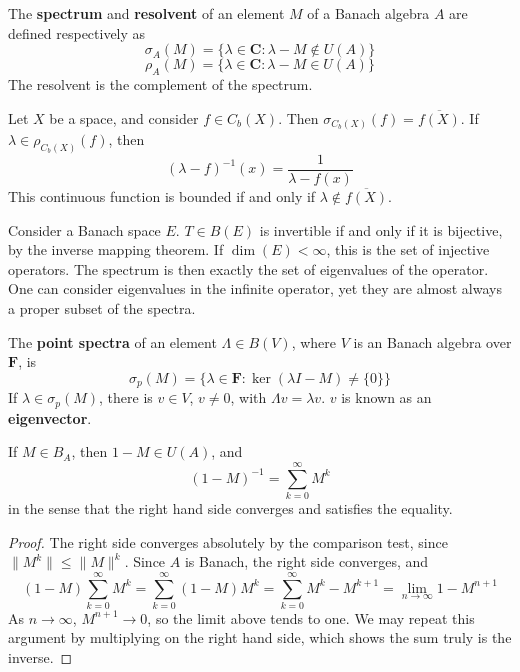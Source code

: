 \begin{definition}
    The {\bf spectrum} and {\bf resolvent} of an element $M$ of a Banach algebra $A$ are defined respectively as
    \[ \sigma_{A}(M) = \{ \lambda \in \mathbf{C} : \lambda - M \not \in U(A) \} \]
    \[ \rho_{A}(M) = \{ \lambda \in \mathbf{C} : \lambda - M \in U(A) \} \]
    The resolvent is the complement of the spectrum.
\end{definition}

\begin{example}
    Let $X$ be a space, and consider $f \in C_b(X)$. Then $\sigma_{C_b(X)}(f) = \overline{f(X)}$. If $\lambda \in \rho_{C_b(X)}(f)$, then
    \[ (\lambda - f)^{-1}(x) = \frac{1}{\lambda - f(x)} \]
    This continuous function is bounded if and only if $\lambda \not \in \overline{f(X)}$.
\end{example}

\begin{example}
    Consider a Banach space $E$. $T \in B(E)$ is invertible if and only if it is bijective, by the inverse mapping theorem. If $\dim(E) < \infty$, this is the set of injective operators. The spectrum is then exactly the set of eigenvalues of the operator. One can consider eigenvalues in the infinite operator, yet they are almost always a proper subset of the spectra.
\end{example}

\begin{definition}
    The {\bf point spectra} of an element $\Lambda \in B(V)$, where $V$ is an Banach algebra over $\mathbf{F}$, is
    \[ \sigma_p(M) = \{ \lambda \in \mathbf{F} : \ker(\lambda I - M) \neq \{ 0 \} \} \]
    If $\lambda \in \sigma_p(M)$, there is $v \in V$, $v \neq 0$, with $\Lambda v = \lambda v$. $v$ is known as an {\bf eigenvector}.
\end{definition}

\begin{lemma}
    If $M \in B_{A}$, then $1 - M \in U(A)$, and
    \[ (1 - M)^{-1} = \sum_{k = 0}^\infty M^k \]
    in the sense that the right hand side converges and satisfies the equality.
\end{lemma}
\begin{proof}
    The right side converges absolutely by the comparison test, since $\| M^k \| \leq \| M \|^k$. Since $A$ is Banach, the right side converges, and
    \[ (1 - M) \sum_{k = 0}^\infty M^k = \sum_{k = 0}^\infty (1 - M)M^k = \sum_{k = 0}^\infty M^k - M^{k+1} = \lim_{n \to \infty} 1 - M^{n+1} \]
    As $n \to \infty$, $M^{n+1} \to 0$, so the limit above tends to one. We may repeat this argument by multiplying on the right hand side, which shows the sum truly is the inverse.
\end{proof}

